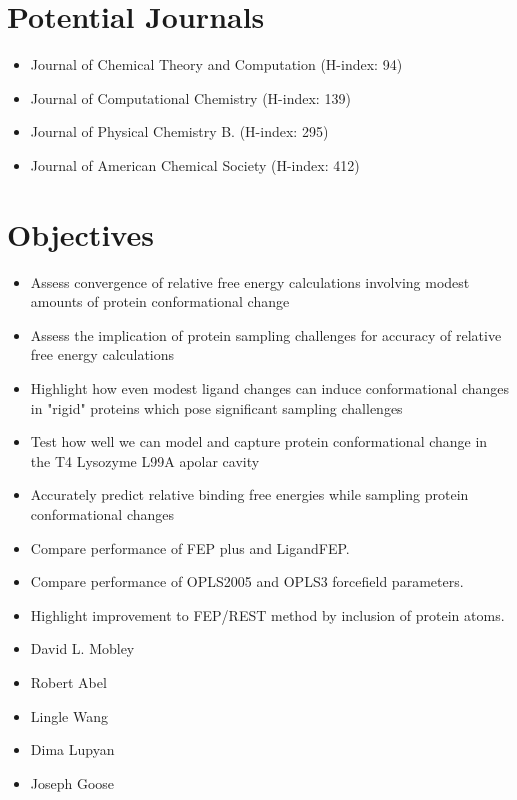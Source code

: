 \documentclass[journal=jctcce,manuscript=article]{achemso}
\begin{document}
\pagebreak

\section{Potential Journals}
\begin{itemize}
   \item Journal of Chemical Theory and Computation (H-index: 94)
   \item Journal of Computational Chemistry (H-index: 139)
   \item Journal of Physical Chemistry B. (H-index: 295)
   \item Journal of American Chemical Society (H-index: 412)
\end{itemize}

\section{Objectives}
\begin{itemize}
   \item Assess convergence of relative free energy calculations involving modest amounts of protein conformational change
   \item Assess the implication of protein sampling challenges for accuracy of relative free energy calculations
   \item Highlight how even modest ligand changes can induce conformational changes in "rigid" proteins which pose significant sampling challenges
   \item Test how well we can model and capture protein conformational change in the T4 Lysozyme L99A apolar cavity
   \item Accurately predict relative binding free energies while sampling protein conformational changes
   \item Compare performance of FEP plus \cite{FEPplus} and LigandFEP.
   \item Compare performance of OPLS2005 and OPLS3 forcefield parameters.
   \item Highlight improvement to FEP/REST \cite{REST2} method by inclusion of protein atoms.
\end{itemize}

\begin{acknowledgement}
\begin{itemize}
   \item David L. Mobley
   \item Robert Abel
   \item Lingle Wang
   \item Dima Lupyan
   \item Joseph Goose
\end{itemize}
\end{acknowledgement}
\end{document}
